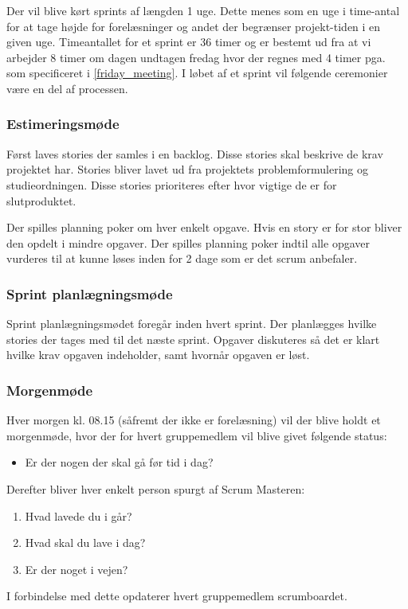 {Der vil blive kørt sprints af længden 1 uge.
Dette menes som en uge i time-antal for at tage højde for forelæsninger og andet der begrænser projekt-tiden i en given uge.
Timeantallet for et sprint er 36 timer og er bestemt ud fra at vi arbejder 8 timer om dagen undtagen fredag hvor der regnes med 4 timer pga.  som specificeret i \cref{friday_meeting}.
I løbet af et sprint vil følgende ceremonier være en del af processen.

\subsubsection{Estimeringsmøde}
Først laves stories der samles i en backlog. 
Disse stories skal beskrive de krav projektet har. 
Stories bliver lavet ud fra projektets problemformulering og studieordningen.
Disse stories prioriteres efter hvor vigtige de er for slutproduktet.

Der spilles planning poker om hver enkelt opgave.
Hvis en story er for stor bliver den opdelt i mindre opgaver.
Der spilles planning poker indtil alle opgaver vurderes til at kunne løses inden for 2 dage som er det scrum\cite{larman} anbefaler.

\subsubsection{Sprint planlægningsmøde}
Sprint planlægningsmødet foregår inden hvert sprint. 
Der planlægges hvilke stories der tages med til det næste sprint. 
Opgaver diskuteres så det er klart hvilke krav opgaven indeholder, samt hvornår opgaven er løst.

\subsubsection{Morgenmøde}
Hver morgen kl. 08.15 (såfremt der ikke er forelæsning) vil der blive holdt et morgenmøde, hvor der for hvert gruppemedlem vil blive givet følgende status:
\begin{itemize}
\item{Er der nogen der skal gå før tid i dag?}
\end{itemize}
Derefter bliver hver enkelt person spurgt af Scrum Masteren:
\begin{enumerate}
\item{Hvad lavede du i går?}
\item{Hvad skal du lave i dag?}
\item{Er der noget i vejen?}
\end{enumerate}
I forbindelse med dette opdaterer hvert gruppemedlem scrumboardet.

}
